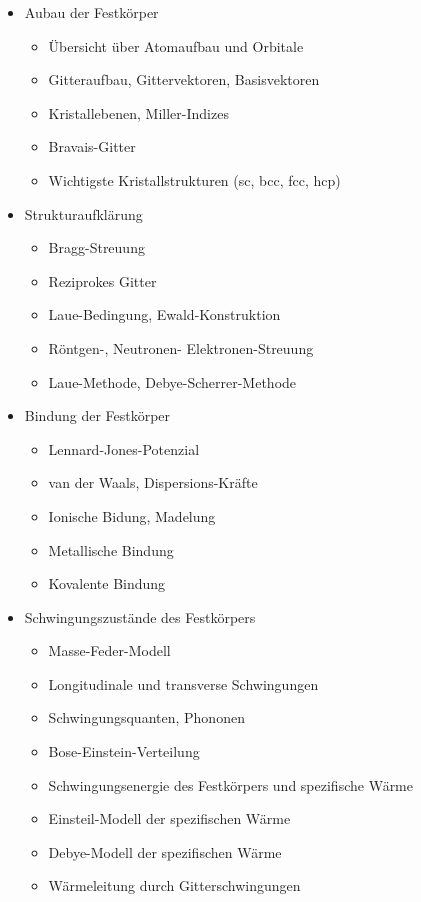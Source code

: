 \documentclass[12pt,twoside,fleqn,a4paper]{article}
\begin{document}
\begin{itemize}
\setlength\itemsep{0cm}
\item Aubau der Festkörper
\begin{itemize}
\item Übersicht über Atomaufbau und Orbitale
\item Gitteraufbau, Gittervektoren, Basisvektoren
\item Kristallebenen, Miller-Indizes
\item Bravais-Gitter
\item Wichtigste Kristallstrukturen (sc, bcc, fcc, hcp)
\end{itemize}

\item Strukturaufklärung
\begin{itemize}
\item Bragg-Streuung
\item Reziprokes Gitter
\item Laue-Bedingung, Ewald-Konstruktion
\item Röntgen-, Neutronen- Elektronen-Streuung
\item Laue-Methode, Debye-Scherrer-Methode
\end{itemize}

\item Bindung der Festkörper
\begin{itemize}
\item Lennard-Jones-Potenzial
\item van der Waals, Dispersions-Kräfte
\item Ionische Bidung, Madelung
\item Metallische Bindung
\item Kovalente Bindung
\end{itemize}

\item Schwingungszustände des Festkörpers
\begin{itemize}
\item Masse-Feder-Modell
\item Longitudinale und transverse Schwingungen
\item Schwingungsquanten, Phononen
\item Bose-Einstein-Verteilung
\item Schwingungsenergie des Festkörpers und spezifische Wärme
\item Einsteil-Modell der spezifischen Wärme
\item Debye-Modell der spezifischen Wärme
\item Wärmeleitung durch Gitterschwingungen
\end{itemize}


\end{itemize}
\end{document}
